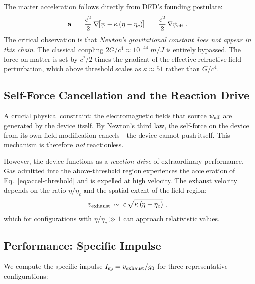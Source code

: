 \documentclass[twocolumn,prl,superscriptaddress,nofootinbib,longbibliography,floatfix]{revtex4-2}
\newcommand{\avec}{\mathbf{a}}
\begin{document}
The matter acceleration follows directly from DFD's founding postulate:
\begin{equation}\label{eq:accel-threshold}
  \avec \;=\; \frac{c^2}{2}\,\nabla\!\bigl[\psi + \kappa\,(\eta - \eta_c)\bigr]
  \;=\; \frac{c^2}{2}\,\nabla\psi_{\rm eff} \;.
\end{equation}
The critical observation is that \emph{Newton's gravitational constant
does not appear in this chain}.  The classical coupling
$2G/c^4 \approx 10^{-44}\;\si{m/J}$ is entirely bypassed.  The force
on matter is set by $c^2/2$ times the gradient of the effective
refractive field perturbation, which above threshold scales as
$\kappa \approx 51$ rather than $G/c^4$.

\subsection{Self-Force Cancellation and the Reaction Drive}\label{ssec:reaction-drive}

A crucial physical constraint: the electromagnetic fields that source
$\psi_{\rm eff}$ are generated by the device itself.  By Newton's third
law, the self-force on the device from its own field modification
cancels---the device cannot push itself.  This mechanism is therefore
\emph{not} reactionless.

However, the device functions as a \emph{reaction drive} of extraordinary
performance.  Gas admitted into the above-threshold region experiences the
acceleration of Eq.~\eqref{eq:accel-threshold} and is expelled at high
velocity.  The exhaust velocity depends on the ratio $\eta/\eta_c$ and
the spatial extent of the field region:
\begin{equation}\label{eq:vexhaust}
  v_{\rm exhaust} \;\sim\; c\,\sqrt{\kappa\,(\eta - \eta_c)} \;,
\end{equation}
which for configurations with $\eta/\eta_c \gg 1$ can approach
relativistic values.

\subsection{Performance: Specific Impulse}\label{ssec:isp}

We compute the specific impulse $I_{\rm sp} = v_{\rm exhaust}/g_0$ for
three representative configurations:
\end{document}
